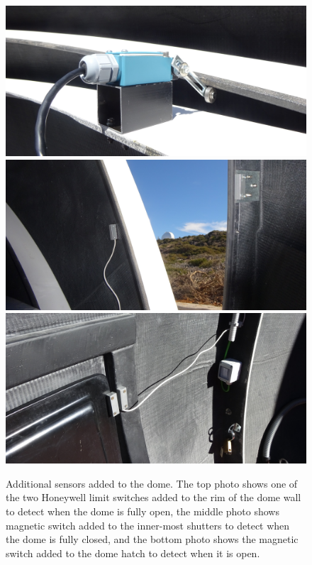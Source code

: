 \begin{colsection}
\begin{figure}[p]
    \begin{center}
        \includegraphics[width=0.8\linewidth]{images/dome_sensor_1.jpg}
        \includegraphics[width=0.8\linewidth]{images/dome_sensor_2.jpg}
        \includegraphics[width=0.8\linewidth]{images/dome_sensor_3.jpg}
    \end{center}
    \caption[Additional sensors added to the dome]{
        Additional sensors added to the dome. The top photo shows one of the two Honeywell limit switches added to the rim of the dome wall to detect when the dome is fully open, the middle photo shows magnetic switch added to the inner-most shutters to detect when the dome is fully closed, and the bottom photo shows the magnetic switch added to the dome hatch to detect when it is open.
    }\label{fig:dome_switches}
\end{figure}


\end{colsection}
